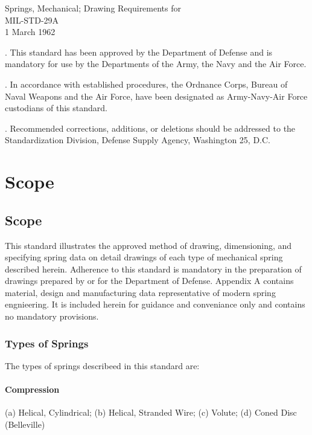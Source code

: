 \documentclass[10pt]{article}
\begin{document}
\bigskip

\noindent
Springs, Mechanical; Drawing Requirements for \\
MIL-STD-29A \\
1 March 1962

\bigskip

. This standard has been approved by the Department of Defense and is mandatory
for use by the Departments of the Army, the Navy and the Air Force.

\medskip
{}. In accordance with established procedures, the Ordnance Corps, Bureau of Naval
Weapons and the Air Force, have been designated as Army-Navy-Air Force custodians
of this standard.

\medskip
{}. Recommended corrections, additions, or deletions should be addressed to the
Standardization Division, Defense Supply Agency, Washington 25, D.C.

\newpage


\section{Scope}
\subsection{Scope}
This standard illustrates the approved method of drawing, dimensioning, and specifying spring data on detail drawings of each type of mechanical spring described herein.
Adherence to this standard is mandatory in the preparation of drawings prepared by or for the Department of Defense.
Appendix A contains material, design and manufacturing data representative of modern spring engnieering.
It is included herein for guidance and conveniance only and contains no mandatory provisions.

\subsubsection{Types of Springs}

The types of springs describeed in this standard are:
\paragraph{Compression}
(a) Helical, Cylindrical; (b) Helical, Stranded Wire; (c) Volute; (d) Coned Disc (Belleville)
\end{document}
